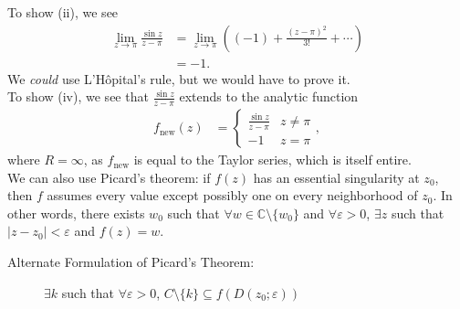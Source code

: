 \documentclass[10pt]{extarticle}
\newcommand{\C}{\mathbb{C}}
\begin{document}
  To show (ii), we see
  \begin{align*}
    \lim_{z\rightarrow \pi}\frac{\sin z}{z-\pi} &= \lim_{z\rightarrow \pi} \left((-1) + \frac{(z-\pi)^2}{3!} + \cdots\right)\\
                                                &= -1.
  \end{align*}
  We \textit{could} use L'Hôpital's rule, but we would have to prove it.\\

  To show (iv), we see that $\frac{\sin z}{z-\pi}$ extends to the analytic function
  \begin{align*}
    f_{\text{new}}(z) &= \begin{cases}
      \frac{\sin z}{z-\pi} & z\neq \pi\\
      -1 & z=\pi
    \end{cases},
  \end{align*}
  where $R = \infty$, as $f_{\text{new}}$ is equal to the Taylor series, which is itself entire.\\

  We can also use Picard's theorem: if $f(z)$ has an essential singularity at $z_0$, then $f$ assumes every value except possibly one on every neighborhood of $z_0$. In other words, there exists $w_0$ such that $\forall w\in \C\setminus \{w_0\}$ and $\forall \varepsilon > 0$, $\exists z$ such that $|z-z_0| < \varepsilon$ and $f(z) = w$.
  \begin{description}
    \item[Alternate Formulation of Picard's Theorem:] $\exists k$ such that  $\forall \varepsilon > 0$, $C\setminus \{k\} \subseteq f(D(z_0;\varepsilon))$
  \end{description}
\end{document}
